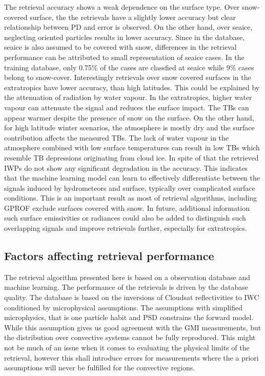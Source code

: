 \documentclass[amt, manuscript]{copernicus}
\begin{document}
The retrieval accuracy shows a weak dependence on the surface type. Over snow-covered surface, the the retrievals have a slightly lower accuracy but clear relationship between PD and error is observed. On the other hand, over seaice, neglecting oriented particles results in lower accuracy. Since in the database, seaice is also assumed to be covered with snow, differences in the retrieval performance can be attributed to small representation of seaice cases. In the training database, only 0.75\% of the cases are classfied at seaice while 9\% cases belong to snow-cover. Interestingly retrievals over snow covered surfaces in the extratropics have lower accuracy, than high latitudes. This could be explained by the attenuation of radiation by water vapour. In the extratropics, higher water vapour can attenuate the signal and reduces the surface impact. The TBs can appear warmer despite the presence of snow on the surface.  On the other hand, for high latitude winter scenarios, the atmosphere is mostly dry and the surface contribution affects the measured TBs. The lack of water vapour in the atmosphere combined with low surface temperatures can result in low TBs which resemble TB depressions originating from cloud ice. In spite of that the retrieved IWPs do not show any significant degradation in the accuracy. This indicates that the machine learning model can learn to effectively differentiate between the signals induced by hydrometeors and surface, typically over complicated surface conditions. This is an important result as most of retrieval algorithms, including GPROF exclude surfaces covered with snow. In future, additional information such  surface emissivities or radiances could also be added to distinguish such overlapping signals and improve retrievals further, especially for extratropics.  


\subsection{Factors affecting retrieval performance}
%
The retrieval algorithm presented here is based on a observation database and machine learning. The performance of the retrievals is driven by the database quality. The database is based on the inversions of Cloudsat reflectivities to IWC conditioned by microphysical assumptions. The assumptions with simplified microphysics, that is one particle habit and PSD constrains the forward model. While this assumption gives us good agreement with the GMI measurements, but the distribution over convective systems cannot be fully reproduced. This might not be much of an issue when it comes to evaluating the physical limits of the retrieval, however this shall introduce errors for measurements where the a priori assumptions will never be fulfilled for the convective regions.
\end{document}
